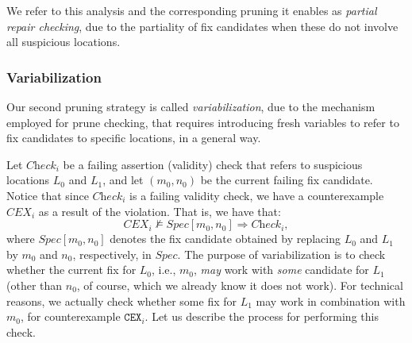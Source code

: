 We refer to this analysis and the corresponding pruning it enables as \emph{partial repair checking}, due to the partiality of fix candidates when these do not involve all suspicious locations.

\subsubsection{Variabilization}

Our second pruning strategy is called \emph{variabilization}, due to the mechanism employed for prune checking, that requires introducing fresh variables to refer to fix candidates to specific locations, in a general way.

Let $\textit{Check}_i$ be a failing assertion (validity) check that refers to suspicious locations $L_0$ and $L_1$, and let $(m_0, n_0)$ be the current failing fix candidate. Notice that since $\textit{Check}_i$ is a failing validity check, we have a counterexample $\textit{CEX}_i$ as a result of the violation. That is, we have that:
\begin{displaymath}
    \textit{CEX}_i \not \models \textit{Spec}[m_0, n_0] \Rightarrow \textit{Check}_i,
\end{displaymath}
where $\textit{Spec}[m_0, n_0]$ denotes the fix candidate obtained by replacing $L_0$ and $L_1$ by $m_0$ and $n_0$, respectively, in $\textit{Spec}$. The purpose of variabilization is to check whether the current fix for $L_0$, i.e., $m_0$, \emph{may} work with \emph{some} candidate for $L_1$ (other than $n_0$, of course, which we already know it does not work). For technical reasons, we actually check whether some fix for $L_1$ may work in combination with $m_0$, for counterexample $\texttt{CEX}_i$. Let us describe the process for performing this check. 

